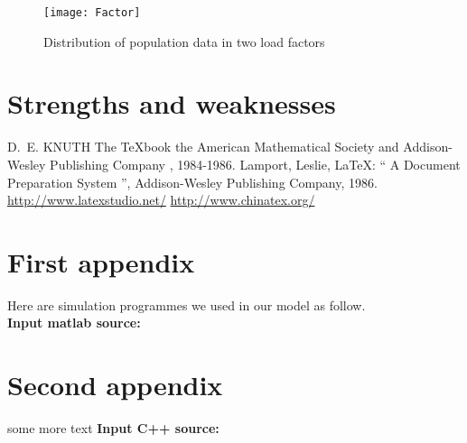 \documentclass{mcmthesis}
\begin{document}
\begin{figure}[!h] %
	\small
	\centering
	\texttt{[image: Factor]}
	\caption{Distribution of population data in two load factors} %
	\label{fig:Factor}
\end{figure}











\section{Strengths and weaknesses} %





\begin{thebibliography}{99}
 D.~E. KNUTH   The \TeX{}book  the American
Mathematical Society and Addison-Wesley
Publishing Company , 1984-1986.
Lamport, Leslie,  \LaTeX{}: `` A Document Preparation System '',
Addison-Wesley Publishing Company, 1986. 
\url{http://www.latexstudio.net/}
\url{http://www.chinatex.org/}
\end{thebibliography}


\begin{appendices}

\section{First appendix}

Here are simulation programmes we used in our model as follow.\\

\textbf{\textcolor[rgb]{0.98,0.00,0.00}{Input matlab source:}}



\section{Second appendix}
some more text \textcolor[rgb]{0.98,0.00,0.00}{\textbf{Input C++ source:}}

\end{appendices}
\end{document}
